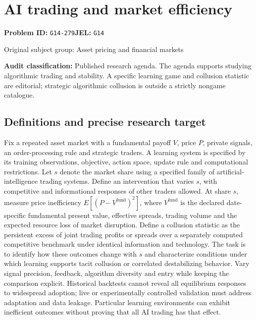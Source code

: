 \documentclass[11pt,a4paper]{article}
\begin{document}
\section*{AI trading and market efficiency}
\textbf{Problem ID:} \texttt{G14-279}\quad \textbf{JEL:} \texttt{G14}\par
\label{problem:OP-0319}
{\sffamily\small\color{muted}Original subject group: Asset pricing and financial markets\par}
\label{definitions:problem:30007601}
\textbf{Audit classification:} Published research agenda. The agenda supports studying algorithmic trading and stability. A specific learning game and collusion statistic are editorial; strategic algorithmic collusion is outside a strictly nongame catalogue.
\subsection*{Definitions and precise research target}
Fix a repeated asset market with a fundamental payoff \(V\), price \(P\), private signals, an order-processing rule and strategic traders. A learning system is specified by its training observations, objective, action space, update rule and computational restrictions. Let \(s\) denote the market share using a specified family of artificial-intelligence trading systems. Define an intervention that varies \(s\), with competitive and informational responses of other traders allowed. At share \(s\), measure price inefficiency \(E[(P-V^{\mathrm{fund}})^2]\), where \(V^{\mathrm{fund}}\) is the declared date-specific fundamental present value, effective spreads, trading volume and the expected resource loss of market disruption. Define a collusion statistic as the persistent excess of joint trading profits or spreads over a separately computed competitive benchmark under identical information and technology. The task is to identify how these outcomes change with \(s\) and characterize conditions under which learning supports tacit collusion or correlated destabilizing behavior. Vary signal precision, feedback, algorithm diversity and entry while keeping the comparison explicit. Historical backtests cannot reveal all equilibrium responses to widespread adoption; live or experimentally controlled validation must address adaptation and data leakage. Particular learning environments can exhibit inefficient outcomes without proving that all AI trading has that effect.
\end{document}
